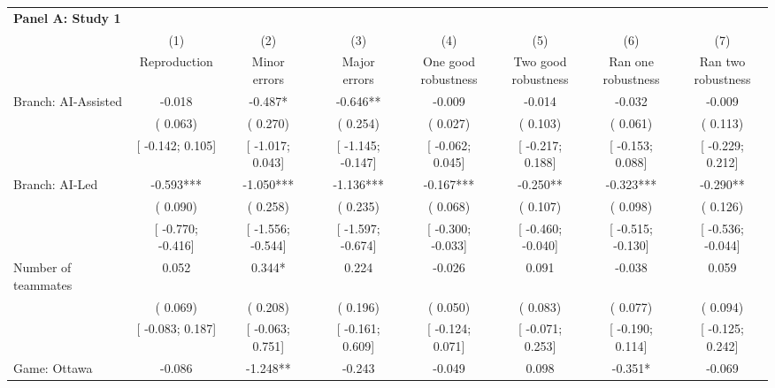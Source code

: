 \def\sym#1{\ifmmode^{#1}\else\(^{#1}\)\fi}
\begin{tabular}{l*{7}{c}}
\hline\hline
\multicolumn{8}{l}{\textbf{Panel A: Study 1}}\\
& (1) & (2) & (3) & (4) & (5) & (6) & (7)\\
                    &Reproduction   &\shortstack[c]{Minor\\errors}   &\shortstack[c]{Major\\errors}   &\shortstack[c]{One good\\robustness}   &\shortstack[c]{Two good\\robustness}   &\shortstack[c]{Ran one\\robustness}   &\shortstack[c]{Ran two\\robustness}   \\
\hline
Branch: AI-Assisted &   -0.018   &   -0.487*   &   -0.646**   &   -0.009   &   -0.014   &   -0.032   &   -0.009   \\
                    &(    0.063)   &(    0.270)   &(    0.254)   &(    0.027)   &(    0.103)   &(    0.061)   &(    0.113)   \\
                    &[   -0.142;     0.105]   &[   -1.017;     0.043]   &[   -1.145;    -0.147]   &[   -0.062;     0.045]   &[   -0.217;     0.188]   &[   -0.153;     0.088]   &[   -0.229;     0.212]   \\
Branch: AI-Led &   -0.593***   &   -1.050***   &   -1.136***   &   -0.167***   &   -0.250**   &   -0.323***   &   -0.290**   \\
                    &(    0.090)   &(    0.258)   &(    0.235)   &(    0.068)   &(    0.107)   &(    0.098)   &(    0.126)   \\
                    &[   -0.770;    -0.416]   &[   -1.556;    -0.544]   &[   -1.597;    -0.674]   &[   -0.300;    -0.033]   &[   -0.460;    -0.040]   &[   -0.515;    -0.130]   &[   -0.536;    -0.044]   \\
Number of teammates &    0.052   &    0.344*   &    0.224   &   -0.026   &    0.091   &   -0.038   &    0.059   \\
                    &(    0.069)   &(    0.208)   &(    0.196)   &(    0.050)   &(    0.083)   &(    0.077)   &(    0.094)   \\
                    &[   -0.083;     0.187]   &[   -0.063;     0.751]   &[   -0.161;     0.609]   &[   -0.124;     0.071]   &[   -0.071;     0.253]   &[   -0.190;     0.114]   &[   -0.125;     0.242]   \\
Game: Ottawa &   -0.086   &   -1.248**   &   -0.243   &   -0.049   &    0.098   &   -0.351*   &   -0.069   \\

\end{tabular}
